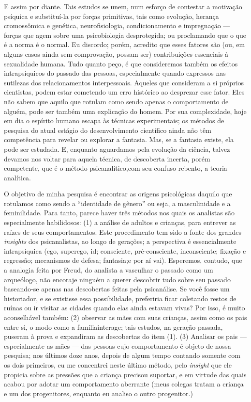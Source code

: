E assim por diante. Tais estudos se unem, num esforço de contestar a
motivação psíquica e substituí-la por forças primitivas, tais como
evolução, herança cromossômica e genética,\idxgenet{} neurofisiologia,
condicionamento e impregnação --- forças que agem sobre uma
psicobiologia desprotegida; ou proclamando que o que é a norma é o
normal. Eu discordo; porém, acredito que esses fatores são (ou, em
alguns casos ainda sem comprovação, possam ser) contribuições
essenciais à sexualidade humana. Tudo quanto peço, é que consideremos
também os efeitos intrapsíquicos do passado das pessoas, especialmente
quando expressos nas sutilezas dos relacionamentos interpessoais.
Aqueles que consideram a si próprios cientistas, podem estar cometendo
um erro histórico ao desprezar esse fator. Eles não sabem que aquilo
que rotulam como sendo apenas o comportamento de alguém, pode ser
também uma explicação do homem. Por sua complexidade, hoje em dia o
espírito humano escapa às técnicas experimentais; os métodos de
pesquisa do atual estágio do desenvolvimento científico ainda não têm
competência para revelar ou explorar a fantasia. Mas, se a fantasia
existe, ela pode ser estudada. E, enquanto aguardamos pela evolução da
ciência, talvez devamos nos voltar para aquela técnica, de descoberta
incerta, porém competente, que é o método psicanalítico,\idxpsica[|(] com seu
confuso rebento, a teoria analítica.

O objetivo de minha pesquisa é encontrar as origens psicológicas
daquilo que rotulamos como sendo a ``identidade de
gênero''\idxiden{} ou seja, a masculinidade e a feminilidade. Para
tanto, parece haver três métodos nos quais os analistas são
especialmente habilidosos: (1) a análise de adultos e crianças, para
entrever as raízes de seus comportamentos. Este procedimento tem sido a
fonte dos grandes \emph{insights} dos psicanalistas, ao longo de gerações; a
perspectiva é essencialmente intrapsíquica (ego, superego, id;
consciente, pré-consciente, inconsciente; fixação e regressão;
mecanismos de defesa; fantasia;\idxfanta[|)] e por aí vai). Esperemos, contudo, que
a analogia feita por Freud,\idxfreud{} do analista a vasculhar o passado como um
arqueólogo, não encoraje ninguém a querer descobrir tudo sobre seu
passado baseando-se apenas nas descobertas feitas pela psicanálise. Se
você fosse um historiador, e se existisse essa possibilidade,
preferiria ficar coletando restos de ruínas ou ir visitar as cidades
quando elas ainda estavam vivas? Por isso, é muito aconselhável também:
 (2) observar as mães\idxmaes{} com suas crianças, assim como os pais entre si, o
modo como a família\idxinflu[|(] interage; tais estudos, na geração passada, puseram
à prova e expandiram as descobertas do item (1). (3) Analisar os pais ---
especialmente as mães --- das pessoas cujo comportamento é objeto de
nossa pesquisa; nos últimos doze anos, depois de algum tempo contando
somente com os dois primeiros, eu me concentrei neste último método,
pelo \emph{insight} que ele propicia sobre as pressões que a criança precisou
suportar, e em virtude das quais acabou por adotar um comportamento
aberrante (meus colegas tratam a criança e um dos progenitores,
enquanto eu analiso o outro progenitor.)


